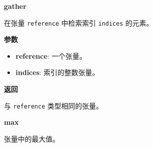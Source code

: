\begin{Shaded}
\begin{Highlighting}[]
\OperatorTok{>>>} \OperatorTok{=} \NormalTok{, }\NormalTok{))}
\OperatorTok{>>>} 
\OperatorTok{<} \OperatorTok{=}\NormalTok{(}\NormalTok{, }\OperatorTok{=}\OperatorTok{>}
\OperatorTok{>>>} \OperatorTok{=} 
\OperatorTok{>>>} 
\OperatorTok{<} \OperatorTok{=}\NormalTok{(}\NormalTok{, }\OperatorTok{=}\OperatorTok{>}
\end{Highlighting}
\end{Shaded}


\textbf{gather}\label{gather}

\begin{Shaded}
\begin{Highlighting}[]
\end{Highlighting}
\end{Shaded}

在张量 \texttt{reference} 中检索索引 \texttt{indices} 的元素。

\textbf{参数}

\begin{itemize}
\tightlist
\item
  \textbf{reference}: 一个张量。
\item
  \textbf{indices}: 索引的整数张量。
\end{itemize}

\textbf{返回}

与 \texttt{reference} 类型相同的张量。


\textbf{max}\label{max}

\begin{Shaded}
\begin{Highlighting}[]
\OperatorTok{=}\OperatorTok{=}\NormalTok{)}
\end{Highlighting}
\end{Shaded}

张量中的最大值。


